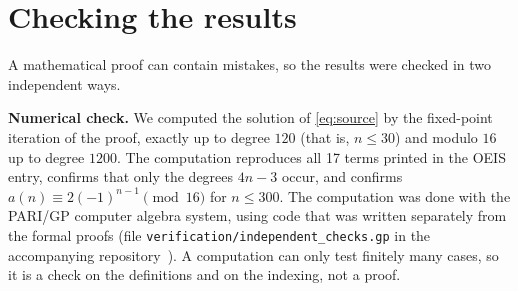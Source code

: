 \documentclass[11pt,a4paper]{article}
\theoremstyle{definition}
\theoremstyle{remark}
\newcommand{\para}[1]{\par\medskip\noindent\textbf{#1}\enspace}
\begin{document}
\section{Checking the results}\label{sec:checks}

A mathematical proof can contain mistakes, so the results were checked in two independent ways.

\para{Numerical check.}
We computed the solution of \eqref{eq:source} by the fixed-point iteration of the proof, exactly up to degree $120$
(that is, $n\le30$) and modulo $16$ up to degree $1200$. The computation reproduces all 17 terms printed in the OEIS
entry, confirms that only the degrees $4n-3$ occur, and confirms $a(n)\equiv2(-1)^{n-1}\pmod{16}$ for $n\le300$.
The computation was done with the PARI/GP computer algebra system, using code that was written separately from the
formal proofs (file \texttt{verification/independent\_checks.gp} in the accompanying repository~\cite{repo}).
A computation can only test finitely many cases, so it is a check on the definitions and on the indexing, not a proof.
\end{document}
